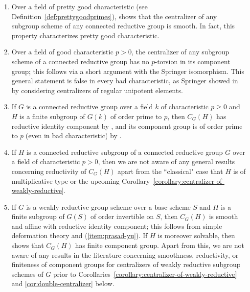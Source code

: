 \documentclass[11pt, letterpaper,english]{amsart}
\theoremstyle{plain}
\theoremstyle{definition}
\numberwithin{equation}{section}
\numberwithin{lem}{section}
\begin{document}
\begin{enumerate}
    \item Over a field of pretty good characteristic (see Definition~\ref{def:prettygoodprimes}), \cite{herpel} shows that the centralizer of any subgroup scheme of any connected reductive group is smooth. In fact, this property characterizes pretty good characteristic.
    \item Over a field of good characteristic $p > 0$, the centralizer of any subgroup scheme of a connected reductive group has no $p$-torsion in its component group; this follows via a short argument with the Springer isomorphism. This general statement is false in every bad characteristic, as Springer showed in \cite[Theorem 4.12]{Springer} by considering centralizers of regular unipotent elements.
    \item\label{item:prasad-yu} If $G$ is a connected reductive group over a field $k$ of characteristic $p \geq 0$ and $H$ is a finite subgroup of $G(k)$ of order prime to $p$, then $C_G(H)$ has reductive identity component by \cite[Theorem 2.1]{Prasad-Yu}, and its component group is of order prime to $p$ (even in bad characteristic) by \cite[Proposition VIII.5.11]{Fargues-Scholze}.
    \item If $H$ is a connected reductive subgroup of a connected reductive group $G$ over a field of characteristic $p > 0$, then we are not aware of any general results concerning reductivity of $C_G(H)$ apart from the ``classical" case that $H$ is of multiplicative type \cite[Lemma 2.2.4]{conrad} or the upcoming Corollary~\ref{corollary:centralizer-of-weakly-reductive}.
    \item If $G$ is a weakly reductive group scheme over a base scheme $S$ and $H$ is a finite subgroup of $G(S)$ of order invertible on $S$, then $C_G(H)$ is smooth and affine with reductive identity component; this follows from simple deformation theory and (\ref{item:prasad-yu}). If $H$ is moreover solvable, then \cite[Theorem A.12]{DHKM} shows that $C_G(H)$ has finite component group. Apart from this, we are not aware of any results in the literature concerning smoothness, reductivity, or finiteness of component groups for centralizers of weakly reductive subgroup schemes of $G$ prior to Corollaries~\ref{corollary:centralizer-of-weakly-reductive} and \ref{cor:double-centralizer} below.  
\end{enumerate}

%

%

%
%
%
%
%
%
%
%
\end{document}
